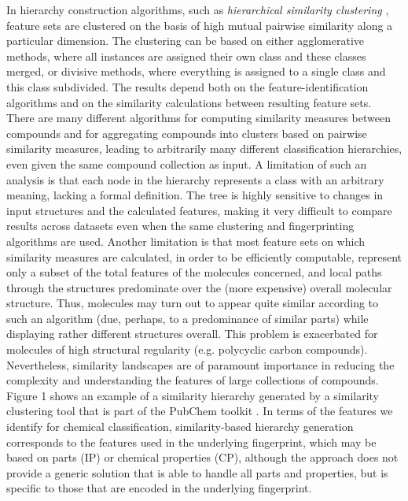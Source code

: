 \documentclass[10pt]{bmc_article}
\newenvironment{bmcformat}{\baselineskip20pt\sloppy\setboolean{publ}{false}}{\baselineskip20pt\sloppy}
\begin{document}
\begin{bmcformat}
In hierarchy construction algorithms, such as \textit{hierarchical similarity clustering} \cite{Adamson1991,barnard1992}, feature sets are clustered on the basis of high mutual pairwise similarity along a particular dimension.  The clustering can be based on either agglomerative methods, where all instances are assigned their own class and these classes merged, or divisive methods, where everything is assigned to a single class and this class subdivided. The results depend both on the feature-identification algorithms and on the similarity calculations between resulting feature sets. There are many different algorithms for computing similarity measures between compounds and for aggregating compounds into clusters based on pairwise similarity measures, leading to arbitrarily many different classification hierarchies, even given the same compound collection as input.  A limitation of such an analysis is that each node in the hierarchy represents a class with an arbitrary meaning, lacking a formal definition.  The tree is highly sensitive to changes in input structures and the calculated features, making it very difficult to compare results across datasets even when the same clustering and fingerprinting algorithms are used. Another limitation is that most feature sets on which similarity measures are calculated, in order to be efficiently computable, represent only a subset of the total features of the molecules concerned, and local paths through the structures predominate over the (more expensive) overall molecular structure. Thus, molecules may turn out to appear quite similar according to such an algorithm (due, perhaps, to a predominance of similar parts) while displaying rather different structures overall.  This problem is exacerbated for molecules of high structural regularity (e.g. polycyclic carbon compounds).  Nevertheless, similarity landscapes are of paramount importance in reducing the complexity and understanding the features of large collections of compounds.
Figure 1 shows an example of a similarity hierarchy generated by a similarity clustering tool that is part of the PubChem toolkit \cite{sayers2008}. 
In terms of the features we identify for chemical classification, similarity-based hierarchy generation corresponds to the features used in the underlying fingerprint, which may be based on parts (IP) or chemical properties (CP), although the approach does not provide a generic solution that is able to handle all parts and properties, but is specific to those that are encoded in the underlying fingerprint. 


\end{bmcformat}
\end{document}
